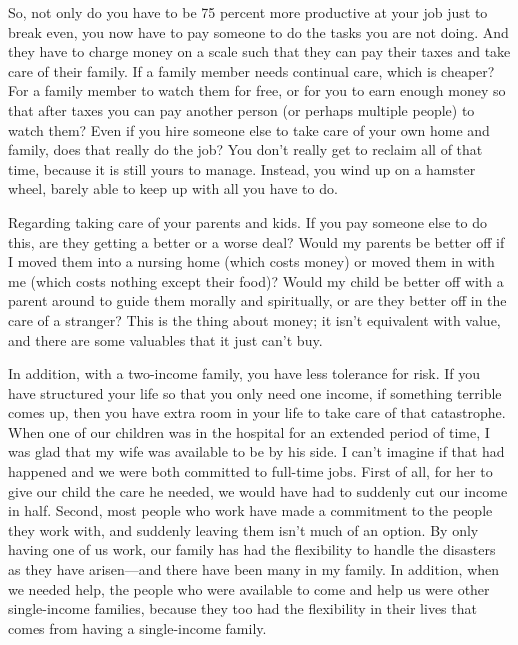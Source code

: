 \documentclass[letterpaper]{article}
\begin{document}
{\color{black}
So, not only do you have to be 75 percent more productive at your job
just to break even, you now have to pay someone to do the tasks you are
not doing. And they have to charge money on a scale such that they can
pay their taxes and take care of their family. If a family member needs
continual care, which is cheaper? For a family member to watch them for
free, or for you to earn enough money so that after taxes you can pay
another person (or perhaps multiple people) to watch them?  Even if you
hire someone else to take care of your own home and family, does that
really do the job?  You don’t really get to reclaim all of that time,
because it is still yours to manage. Instead, you wind up on a hamster
wheel, barely able to keep up with all you have to do.}

{\color{black}
\textcolor[rgb]{0.32941177,0.5529412,0.83137256}{Regarding }taking care
of your parents and kids. If you pay someone else to do this, are they
getting a better or a worse deal?  Would my parents be better off if I
moved them into a nursing home (which costs money) or moved them in
with me (which costs nothing except their food)?  Would my child be
better off with a parent around to guide them morally and spiritually,
or are they better off in the care of a stranger?  This is the thing
about money; it isn’t equivalent with value, and there are some
valuables that it just can’t buy.}

{\color{black}
In addition, with a two-income family, you have less tolerance for risk.
If you have structured your life so that you only need one income, if
something terrible comes up, then you have extra room in your life to
take care of that catastrophe. When one of our children was in the
hospital for an extended period of time, I was glad that my wife was
available to be by his side. I can’t imagine if that had happened and
we were both committed to full-time jobs. First of all, for her to give
our child the care he needed, we would have had to suddenly cut our
income in half. Second, most people who work have made a commitment to
the people they work with, and suddenly leaving them isn’t much of an
option. By only having one of us work, our family has had the
flexibility to handle the disasters as they have arisen—and there have
been many in my family. In addition, when we needed help, the people
who were available to come and help us were other single-income
families, because they too had the flexibility in their lives that
comes from having a single-income family.}
\end{document}
